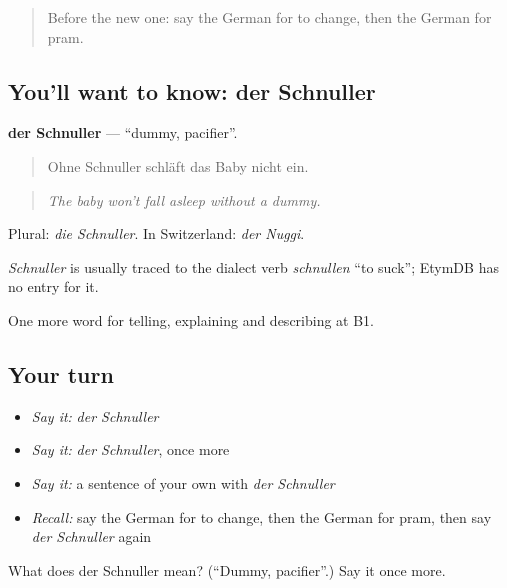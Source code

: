 \label{lesson:GE-C496-schnuller}



\begin{quote}
Before the new one: say the German for to change, then the German for pram.
\end{quote}

\subsection*{You'll want to know: der Schnuller}
\textbf{der Schnuller} — \textquotedblleft{}dummy, pacifier\textquotedblright{}.

\begin{quote}
Ohne Schnuller schläft das Baby nicht ein.
\end{quote}

\begin{quote}
\emph{The baby won't fall asleep without a dummy.}
\end{quote}

Plural: \emph{die Schnuller}. In Switzerland: \emph{der Nuggi}.

\begin{cousinweb}
\emph{Schnuller} is usually traced to the dialect verb \emph{schnullen} \textquotedblleft{}to suck\textquotedblright{}; EtymDB has no entry for it.
\end{cousinweb}

\begin{grammarlens}[title={What you've built}]
One more word for telling, explaining and describing at B1.
\end{grammarlens}

\subsection*{Your turn}
\begin{itemize}
\raggedright
  \item \emph{Say it:} \emph{der Schnuller}
  \item \emph{Say it:} \emph{der Schnuller}, once more
  \item \emph{Say it:} a sentence of your own with \emph{der Schnuller}
  \item \emph{Recall:} say the German for to change, then the German for pram, then say \emph{der Schnuller} again
\end{itemize}

\begin{tcolorbox}[breakable,colback=teal!4,colframe=teal!35!black,title={Before you move on}]
What does der Schnuller mean? (\textquotedblleft{}Dummy, pacifier\textquotedblright{}.) Say it once more.
\end{tcolorbox}
